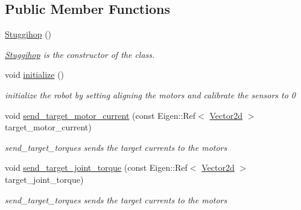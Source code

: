 \subsection*{Public Member Functions}
\begin{DoxyCompactItemize}
\item 
\hyperlink{classblmc__robots_1_1Stuggihop_aea7781a2eb5a410ca8ab2bbfe425cb6a}{Stuggihop} ()
\begin{DoxyCompactList}\small\item\em \hyperlink{classblmc__robots_1_1Stuggihop}{Stuggihop} is the constructor of the class. \end{DoxyCompactList}\item 
\mbox{\label{classblmc__robots_1_1Stuggihop_a2a272c1cb428a2a7250b23d7ca40c894}} 
void \hyperlink{classblmc__robots_1_1Stuggihop_a2a272c1cb428a2a7250b23d7ca40c894}{initialize} ()
\begin{DoxyCompactList}\small\item\em initialize the robot by setting aligning the motors and calibrate the sensors to 0 \end{DoxyCompactList}\item 
\mbox{\label{classblmc__robots_1_1Stuggihop_ab3c118885810575b36c49432a2a5eca5}} 
void \hyperlink{classblmc__robots_1_1Stuggihop_ab3c118885810575b36c49432a2a5eca5}{send\+\_\+target\+\_\+motor\+\_\+current} (const Eigen\+::\+Ref$<$ \hyperlink{common__header_8hpp_acb6916bc8c9fe9d98c484fd4cc201447}{Vector2d} $>$ target\+\_\+motor\+\_\+current)
\begin{DoxyCompactList}\small\item\em send\+\_\+target\+\_\+torques sends the target currents to the motors \end{DoxyCompactList}\item 
\mbox{\label{classblmc__robots_1_1Stuggihop_ac8bae7764c409c8312408ea8adb1165f}} 
void \hyperlink{classblmc__robots_1_1Stuggihop_ac8bae7764c409c8312408ea8adb1165f}{send\+\_\+target\+\_\+joint\+\_\+torque} (const Eigen\+::\+Ref$<$ \hyperlink{common__header_8hpp_acb6916bc8c9fe9d98c484fd4cc201447}{Vector2d} $>$ target\+\_\+joint\+\_\+torque)
\begin{DoxyCompactList}\small\item\em send\+\_\+target\+\_\+torques sends the target currents to the motors \end{DoxyCompactList}\item 

\end{DoxyCompactItemize}
